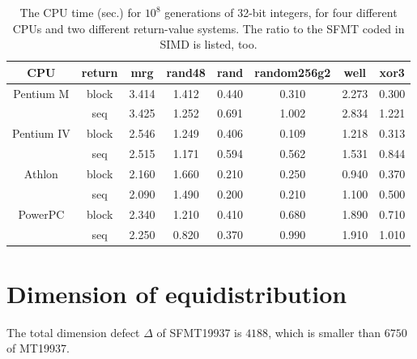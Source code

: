 \documentclass[acmnow]{acmtrans2m}
\begin{document}
\begin{table}
\begin{center}
\begin{tabular}{|c|c||c|c|c|c|c|c|}
\hline
CPU & return & mrg & rand48 & rand & random256g2 & well & xor3  \\ \hline \hline
Pentium M & block & 3.414  & 1.412  & 0.440  & 0.310  & 2.273  & 0.300 \\
\cline{2-8}
 & seq & 3.425  & 1.252  & 0.691  & 1.002  & 2.834  & 1.221 \\ \hline
Pentium IV & block & 2.546  & 1.249  & 0.406  & 0.109  & 1.218  & 0.313 \\
\cline{2-8}
 & seq & 2.515  & 1.171  & 0.594  & 0.562  & 1.531  & 0.844 \\ \hline
Athlon & block & 2.160  & 1.660  & 0.210  & 0.250  & 0.940  & 0.370 \\
\cline{2-8}
 & seq & 2.090  & 1.490  & 0.200  & 0.210  & 1.100  & 0.500 \\ \hline
PowerPC & block & 2.340  & 1.210  & 0.410  & 0.680  & 1.890  & 0.710 \\
\cline{2-8}
 & seq & 2.250  & 0.820  & 0.370  & 0.990  & 1.910  & 1.010 \\ \hline
\end{tabular}
\end{center}
\caption{The CPU time (sec.) for $10^8$ generations of 32-bit integers,
for four different CPUs and two different return-value systems. 
The ratio to the SFMT coded in SIMD is listed, too.}\label{tab:speed-other}
\end{table}

\section{Dimension of equidistribution}
The total dimension defect $\Delta$ of SFMT19937
is $4188$, which is smaller than $6750$ of MT19937.
\end{document}
